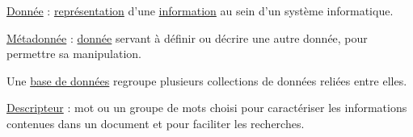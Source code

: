 
\begin{jazzitemize}
\item \href{https://fr.wikipedia.org/wiki/Donn\%C3\%A9e_(informatique)}{Donnée} : \href{https://fr.wikipedia.org/wiki/Repr\%C3\%A9sentation}{représentation} d'une \href{https://fr.wikipedia.org/wiki/Information}{information} au sein d'un système informatique.
\item \href{https://fr.wikipedia.org/wiki/M\%C3\%A9tadonn\%C3\%A9e}{Métadonnée} : \href{https://fr.wikipedia.org/wiki/Donn\%C3\%A9e_(informatique)}{donnée} servant à définir ou décrire une autre donnée, pour permettre sa manipulation.
\item Une \href{https://fr.wikipedia.org/wiki/Base_de_donn\%C3\%A9es}{base de données} regroupe plusieurs collections de données reliées entre elles.
\item \href{https://fr.wiktionary.org/wiki/descripteur}{Descripteur} : mot ou un groupe de mots choisi pour caractériser les informations contenues dans un document et pour faciliter les recherches.
\end{jazzitemize}


